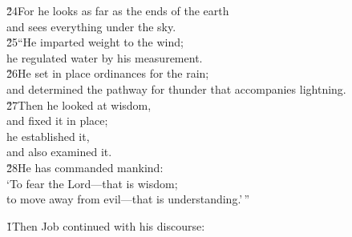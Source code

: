 \begin{poetry}
\poeml \v{24}For he looks as far as the ends of the earth \\
\poemll    and sees everything under the sky. \\
\poeml \v{25}``He imparted weight to the wind; \\
\poemll    he regulated water by his measurement. \\
\poeml \v{26}He set in place ordinances for the rain; \\
\poemll    and determined the pathway for thunder that accompanies lightning. \\
\poeml \v{27}Then he looked at wisdom, \\
\poemll    and fixed it in place; \\
\poeml he established it, \\
\poemll    and also examined it. \\
\poeml \v{28}He has commanded mankind: \\
\poemll    `To fear the Lord---that is wisdom; \\
\poemlll       to move away from evil---that is understanding.'\,''
\end{poetry}

\v{1}Then Job continued with his discourse:

